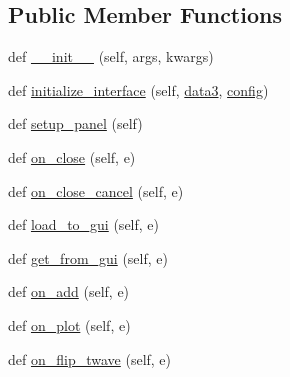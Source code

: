 \subsection*{Public Member Functions}
\begin{DoxyCompactItemize}
\item 
def \hyperlink{class_uni_dec_1_1unidec__modules_1_1_i_m__windows_1_1_i_m_tools_a7c075f101495b7b77b73ff3bba93af7b}{\+\_\+\+\_\+init\+\_\+\+\_\+} (self, args, kwargs)
\item 
def \hyperlink{class_uni_dec_1_1unidec__modules_1_1_i_m__windows_1_1_i_m_tools_a63e053e60197a95fb6c161f9f376ac5e}{initialize\+\_\+interface} (self, \hyperlink{class_uni_dec_1_1unidec__modules_1_1_i_m__windows_1_1_i_m_tools_a87e31c343a7bf7bb4cb87feda1f4869a}{data3}, \hyperlink{class_uni_dec_1_1unidec__modules_1_1_i_m__windows_1_1_i_m_tools_acb95efc8b39730019e369845bb760a84}{config})
\item 
def \hyperlink{class_uni_dec_1_1unidec__modules_1_1_i_m__windows_1_1_i_m_tools_af01ce179a348d24ba81a26ed1d31cf50}{setup\+\_\+panel} (self)
\item 
def \hyperlink{class_uni_dec_1_1unidec__modules_1_1_i_m__windows_1_1_i_m_tools_af04d5319d10b6e10a817d3f4a862e82d}{on\+\_\+close} (self, e)
\item 
def \hyperlink{class_uni_dec_1_1unidec__modules_1_1_i_m__windows_1_1_i_m_tools_a91a5ba9bc67f0cb86ef6f921f017d331}{on\+\_\+close\+\_\+cancel} (self, e)
\item 
def \hyperlink{class_uni_dec_1_1unidec__modules_1_1_i_m__windows_1_1_i_m_tools_a6233c284eec6728458fe0acc8d0030bd}{load\+\_\+to\+\_\+gui} (self, e)
\item 
def \hyperlink{class_uni_dec_1_1unidec__modules_1_1_i_m__windows_1_1_i_m_tools_ac34acfe3495e28358c165c0e615daf74}{get\+\_\+from\+\_\+gui} (self, e)
\item 
def \hyperlink{class_uni_dec_1_1unidec__modules_1_1_i_m__windows_1_1_i_m_tools_a629c046c578d785a9005bdf3cc35545a}{on\+\_\+add} (self, e)
\item 
def \hyperlink{class_uni_dec_1_1unidec__modules_1_1_i_m__windows_1_1_i_m_tools_a7280d0c36d723a6a81f5e780387caa82}{on\+\_\+plot} (self, e)
\item 
def \hyperlink{class_uni_dec_1_1unidec__modules_1_1_i_m__windows_1_1_i_m_tools_a5ae4fc7b85cb254823e1103e420ab232}{on\+\_\+flip\+\_\+twave} (self, e)
\end{DoxyCompactItemize}
